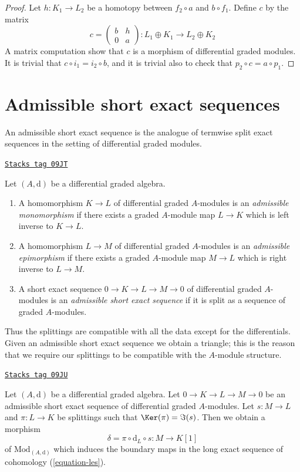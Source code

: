 \begin{proof}
Let $h : K_1 \to L_2$ be a homotopy between $f_2 \circ a$ and $b \circ f_1$.
Define $c$ by the matrix
$$
c =
\left(
\begin{matrix}
b & h \\
0 & a
\end{matrix}
\right) :
L_1 \oplus K_1 \to L_2 \oplus K_2
$$
A matrix computation show that $c$ is a morphism of differential
graded modules. It is trivial that $c \circ i_1 = i_2 \circ b$, and it is
trivial also to check that $p_2 \circ c = a \circ p_1$.
\end{proof}

\section{Admissible short exact sequences}
\label{dga-section-admissible}
An admissible short exact sequence is the analogue of termwise split exact
sequences in the setting of differential graded modules.

\begin{definition}
\label{dga-definition-admissible-ses}
\href{https://stacks.math.columbia.edu/tag/09JT}{\texttt{Stacks tag 09JT}}

Let $(A, \text{d})$ be a differential graded algebra.
\begin{enumerate}
\item A homomorphism $K \to L$ of differential graded $A$-modules
is an {\it admissible monomorphism} if there exists a graded $A$-module
map $L \to K$ which is left inverse to $K \to L$.
\item A homomorphism $L \to M$ of differential graded $A$-modules
is an {\it admissible epimorphism} if there exists a graded $A$-module
map $M \to L$ which is right inverse to $L \to M$.
\item A short exact sequence $0 \to K \to L \to M \to 0$ of differential
graded $A$-modules is an {\it admissible short exact sequence}
if it is split as a sequence of graded $A$-modules.
\end{enumerate}
\end{definition}

Thus the splittings are compatible with all the data except for
the differentials. Given an admissible short exact sequence we
obtain a triangle; this is the reason that we require our splittings
to be compatible with the $A$-module structure.

\begin{lemma}
\label{dga-lemma-admissible-ses}
\href{https://stacks.math.columbia.edu/tag/09JU}{\texttt{Stacks tag 09JU}}

Let $(A, \text{d})$ be a differential graded algebra.
Let $0 \to K \to L \to M \to 0$ be an admissible short exact sequence
of differential graded $A$-modules. Let $s : M \to L$ and $\pi : L \to K$
be splittings such that $\Ker(\pi) = \Im(s)$.
Then we obtain a morphism
$$
\delta = \pi \circ \text{d}_L \circ s : M \to K[1]
$$
of $\text{Mod}_{(A, \text{d})}$ which induces the boundary maps
in the long exact sequence of cohomology (\ref{equation-les}).
\end{lemma}


